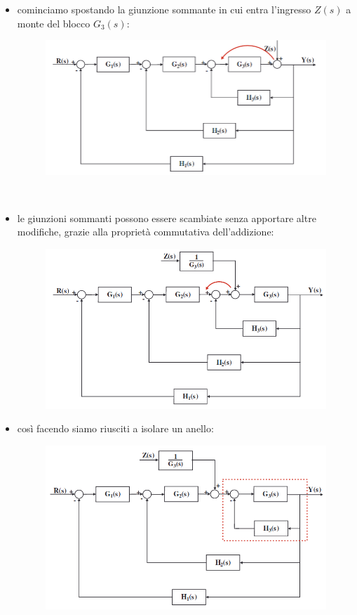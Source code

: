 \documentclass[12pt,a4paper]{article}
\begin{document}
	\begin{itemize}
		\item cominciamo spostando la giunzione sommante in cui entra l'ingresso $Z(s)$ a monte del blocco $G_3(s)$:
		\begin{figure}[h!]
			\centering
			\includegraphics[scale=0.4]{./images/schema26_1.png}
		\end{figure}
		\\
		\item le giunzioni sommanti possono essere scambiate senza apportare altre modifiche, grazie alla propriet\`a commutativa dell'addizione:
		\begin{figure}[h!]
			\centering
			\includegraphics[scale=0.4]{./images/schema26_2.png}
		\end{figure}
		\item cos\`i facendo siamo riusciti a isolare un anello:
		\begin{figure}[h!]
			\centering
			\includegraphics[scale=0.4]{./images/schema26_3.png}

\end{figure}
\end{itemize}
\end{document}
